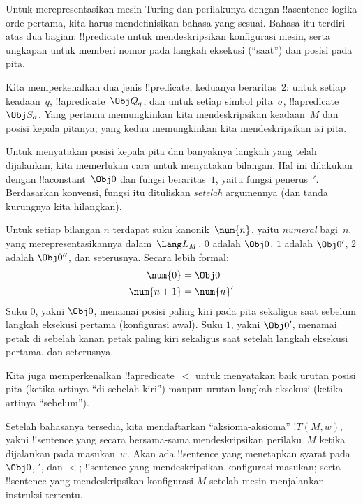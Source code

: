 \documentclass[../../../include/open-logic-section]{subfiles}
\begin{document}

\begin{explain}
Untuk merepresentasikan mesin Turing dan perilakunya dengan !!a{sentence}
logika orde pertama, kita harus mendefinisikan bahasa yang sesuai. Bahasa itu
terdiri atas dua bagian: !!{predicate} untuk mendeskripsikan konfigurasi mesin,
serta ungkapan untuk memberi nomor pada langkah eksekusi (``saat'') dan posisi
pada pita.

Kita memperkenalkan dua jenis !!{predicate}, keduanya beraritas~2: untuk setiap
keadaan~$q$, !!a{predicate}~$\Obj Q_q$, dan untuk setiap simbol pita~$\sigma$,
!!a{predicate}~$\Obj S_\sigma$. Yang pertama memungkinkan kita mendeskripsikan
keadaan~$M$ dan posisi kepala pitanya; yang kedua memungkinkan kita
mendeskripsikan isi pita.

Untuk menyatakan posisi kepala pita dan banyaknya langkah yang telah
dijalankan, kita memerlukan cara untuk menyatakan bilangan. Hal ini dilakukan
dengan !!a{constant}~$\Obj 0$ dan fungsi beraritas~$1$, yaitu fungsi
penerus~$\prime$. Berdasarkan konvensi, fungsi itu dituliskan \emph{setelah}
argumennya (dan tanda kurungnya kita hilangkan).

Untuk setiap bilangan $n$ terdapat suku kanonik~$\num{n}$, yaitu
\emph{numeral} bagi~$n$, yang merepresentasikannya dalam~$\Lang L_M$.
$\num{0}$ adalah $\Obj 0$, $\num{1}$ adalah $\Obj 0'$, $\num{2}$ adalah
$\Obj 0''$, dan seterusnya. Secara lebih formal:
\begin{align*}
\num{0} & = \Obj 0 \\
\num{n+1} &= \num{n}'
\end{align*}
Suku $\num{0}$, yakni $\Obj 0$, menamai posisi paling kiri pada pita sekaligus
saat sebelum langkah eksekusi pertama (konfigurasi awal). Suku $\num{1}$,
yakni $\Obj 0'$, menamai petak di sebelah kanan petak paling kiri sekaligus
saat setelah langkah eksekusi pertama, dan seterusnya.

Kita juga memperkenalkan !!a{predicate}~$<$ untuk menyatakan baik urutan posisi
pita (ketika artinya ``di sebelah kiri'') maupun urutan langkah eksekusi
(ketika artinya ``sebelum'').

Setelah bahasanya tersedia, kita mendaftarkan ``aksioma-aksioma'' $!T(M,w)$,
yakni !!{sentence} yang secara bersama-sama mendeskripsikan perilaku~$M$ ketika
dijalankan pada masukan~$w$. Akan ada !!{sentence} yang menetapkan syarat pada
$\Obj 0$, $\prime$, dan $<$; !!{sentence} yang mendeskripsikan konfigurasi
masukan; serta !!{sentence} yang mendeskripsikan konfigurasi $M$ setelah mesin
menjalankan instruksi tertentu.
\end{explain}
\end{document}
